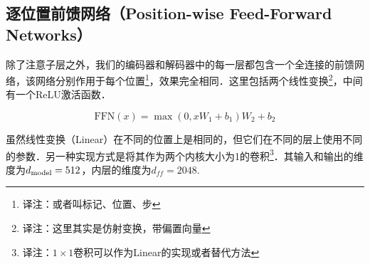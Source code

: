 \subsection{逐位置前馈网络（Position-wise Feed-Forward Networks）}\label{sec:ffn}

除了注意子层之外，我们的编码器和解码器中的每一层都包含一个全连接的前馈网络，该网络分别作用于每个位置\footnote{译注：或者叫标记、位置、步}，效果完全相同．这里包括两个线性变换\footnote{译注：这里其实是仿射变换，带偏置向量}，中间有一个ReLU激活函数．

\begin{equation}
   \mathrm{FFN}(x)=\max(0, xW_1 + b_1) W_2 + b_2
\end{equation}


虽然线性变换（Linear）在不同的位置上是相同的，但它们在不同的层上使用不同的参数．另一种实现方式是将其作为两个内核大小为1的卷积\footnote{译注：$1\times 1$卷积可以作为Linear的实现或者替代方法}．其输入和输出的维度为$d_{\text{model}}=512$，内层的维度为$d_{ff}=2048$.





